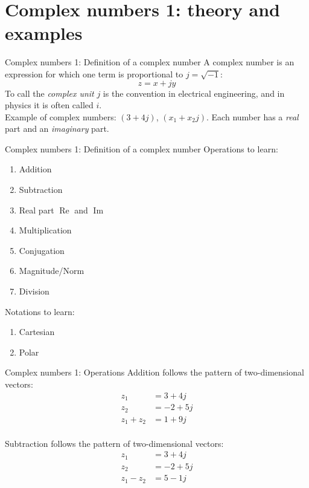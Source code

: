 \documentclass{beamer}
\begin{document}
\section{Complex numbers 1: theory and examples}

\begin{frame}{Complex numbers 1: Definition of a complex number}
A \alert{complex number} is an expression for which one term is proportional to $j = \sqrt{-1}$:
\begin{equation}
z = x + jy
\end{equation}
To call the \textit{complex unit} $j$ is the convention in electrical engineering, and in physics it is often called $i$. \\ \vspace{0.5cm}
Example of complex numbers: $(3+4j)$, $(x_1 + x_2 j)$.  Each number has a \textit{real} part and an \textit{imaginary} part.
\end{frame}

\begin{frame}{Complex numbers 1: Definition of a complex number}
Operations to learn:
\begin{enumerate}
\item Addition
\item Subtraction
\item Real part $\operatorname{Re}$ and $\operatorname{Im}$
\item Multiplication
\item Conjugation
\item Magnitude/Norm
\item Division
\end{enumerate}
Notations to learn:
\begin{enumerate}
\item Cartesian
\item Polar
\end{enumerate}
\end{frame}

\begin{frame}{Complex numbers 1: Operations}
Addition follows the pattern of two-dimensional vectors:
\begin{align}
z_1 &= 3+4j \\
z_2 &= -2+5j \\
z_1 + z_2 &= 1+9j
\end{align} \\
Subtraction follows the pattern of two-dimensional vectors:
\begin{align}
z_1 &= 3+4j \\
z_2 &= -2+5j \\
z_1 - z_2 &= 5-1j
\end{align}
\end{frame}
\end{document}
